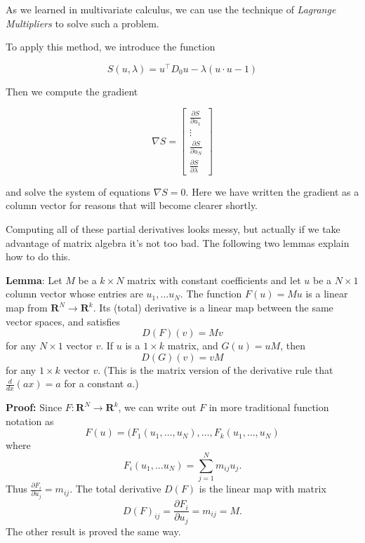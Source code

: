 \documentclass[]{article}
\begin{document}
As we learned in multivariate calculus, we can use the technique of
\emph{Lagrange Multipliers} to solve such a problem.

To apply this method, we introduce the function

\begin{equation}
S(u, \lambda) = u^{\intercal}D_{0}u - \lambda(u\cdot u -1)
\label{eq:lagrange}\end{equation}

Then we compute the gradient

\begin{equation}
\nabla S = \left[\begin{matrix} \frac{\partial S}{\partial u_{1}} \\ \vdots \\ \frac{\partial S}{\partial u_{N}} \\ \frac{\partial S}{\partial \lambda}\end{matrix}\right]
\label{eq:lagrangegradient}\end{equation}

and solve the system of equations \(\nabla S=0\). Here we have written
the gradient as a column vector for reasons that will become clearer
shortly.

Computing all of these partial derivatives looks messy, but actually if
we take advantage of matrix algebra it's not too bad. The following two
lemmas explain how to do this.

\textbf{Lemma}: Let \(M\) be a \(k\times N\) matrix with constant
coefficients and let \(u\) be a \(N\times 1\) column vector whose
entries are \(u_1,\ldots u_{N}\). The function \(F(u) = Mu\) is a linear
map from \(\mathbf{R}^{N}\to\mathbf{R}^{k}\). Its (total) derivative is
a linear map between the same vector spaces, and satisfies \[
D(F)(v) = Mv
\] for any \(N\times 1\) vector \(v\). If \(u\) is a \(1\times k\)
matrix, and \(G(u) = uM\), then \[
D(G)(v) = vM
\] for any \(1\times k\) vector \(v\). (This is the matrix version of
the derivative rule that \(\frac{d}{dx}(ax)=a\) for a constant \(a\).)

\textbf{Proof:} Since \(F:\mathbf{R}^{N}\to\mathbf{R}^{k}\), we can
write out \(F\) in more traditional function notation as \[
F(u) = (F_{1}(u_1,\ldots, u_N), \ldots, F_{k}(u_1,\ldots, u_{N})
\] where \[
F_{i}(u_1,\ldots u_N) = \sum_{j=1}^{N} m_{ij}u_{j}.
\] Thus \(\frac{\partial F_{i}}{\partial u_{j}} = m_{ij}\). The total
derivative \(D(F)\) is the linear map with matrix \[
D(F)_{ij} = \frac{\partial F_{i}}{\partial u_{j}} = m_{ij} = M.
\] The other result is proved the same way.
\end{document}
